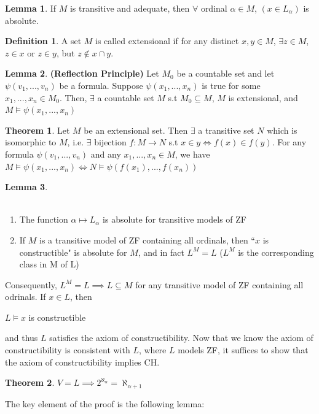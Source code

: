 \documentclass[12pt]{article}
\theoremstyle{definition}
\newtheorem{definition}{Definition}[section]
\newtheorem{theorem}{Theorem}[section]
\newtheorem{lemma}{Lemma}[section]
\begin{document}
\begin{lemma}
If $M$ is transitive and adequate, then $\forall$ ordinal $\alpha \in M$, $(x\in L_\alpha)$ is absolute. 
\end{lemma}
\begin{definition}
    A set $M$ is called extensional if for any distinct $x,y\in M$, $\exists z\in M$, $z\in x$ or $z\in y$, but $z\notin x\cap y$.
\end{definition}
\begin{lemma}
\textbf{(Reflection Principle)} Let $M_0$ be a countable set and let $\psi(v_1,...,v_n)$ be a formula. Suppose $\psi(x_1,...,x_n)$ is true for some $x_1,...,x_n\in M_0$. Then, $\exists$ a countable set $M$ s.t $M_0\subseteq M$, $M$ is extensional, and $M\models \psi(x_1,...,x_n)$
\end{lemma}
\begin{theorem}
Let $M$ be an extensional set. Then $\exists$ a transitive set $N$ which is isomorphic to $M$, i.e. $\exists$ bijection $f:M\to N$ s.t $x\in y \iff f(x) \in f(y)$. For any formula $\psi (v_1,...,v_n)$ and any $x_1,...,x_n \in M$, we have $M \models \psi(x_1,...,x_n) \iff N \models \psi (f(x_1),...,f(x_n))$
\end{theorem}
\begin{lemma} 
\\\
\begin{enumerate}[label=(\roman*)]
\item The function $\alpha \mapsto L_\alpha$ is absolute for transitive models of ZF 
\item If $M$ is a transitive model of ZF containing all ordinals, then ``$x$ is constructible" is absolute for $M$, and in fact $L^M = L$ ($L^M$ is the corresponding class in M of L) 
\end{enumerate}
\end{lemma}
Consequently, $L^M=L \implies L\subseteq M$ for any transitive model of ZF containing all odrinals. If $x\in L$, then 
\begin{center}
    $L\models x$ is constructible 
\end{center}
and thus $L$ satisfies the axiom of constructibility. Now that we know the axiom of constructibility is consistent with $L$, where $L$ models ZF, it suffices to show that the axiom of constructibility implies CH. 
\begin{theorem}\label{thm:main}
$V=L \implies 2^{\aleph_\alpha}=\aleph_{\alpha+1}$
\end{theorem}
The key element of the proof is the following lemma: 
\end{document}

